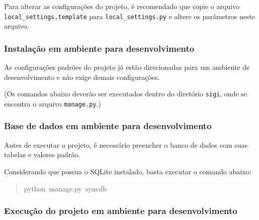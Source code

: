 Para alterar as configurações do projeto, é recomendado que copie o
arquivo \texttt{local{\_}settings.template} para \texttt{local{\_}settings.py} e
altere os parâmetros neste arquivo.



\hypertarget{instala-o-em-ambiente-para-desenvolvimento}{}
\subsubsection*{Instalação em ambiente para desenvolvimento}

As configurações padrões do projeto já estão direcionadas para um
ambiente de desenvolvimento e não exige demais configurações.

(Os comandos abaixo deverão ser executados dentro do diretório
\texttt{sigi}, onde se encontra o arquivo \texttt{manage.py}.)



\hypertarget{base-de-dados-em-ambiente-para-desenvolvimento}{}
\subsubsection*{Base de dados em ambiente para desenvolvimento}

Antes de executar o projeto, é necessário preencher o banco de dados
com suas tabelas e valores padrão.

Considerando que possua o SQLite instalado, basta executar o comando
abaixo:
\begin{quote}{\ttfamily \raggedright \noindent
python~manage.py~syncdb
}\end{quote}



\hypertarget{execu-o-do-projeto-em-ambiente-para-desenvolvimento}{}
\subsubsection*{Execução do projeto em ambiente para desenvolvimento}


